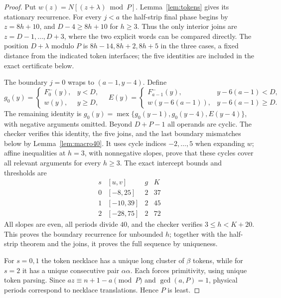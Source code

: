 \documentclass[11pt]{article}
\theoremstyle{remark}\newtheorem{remark}[theorem]{Remark}
\DeclareMathOperator{\mex}{mex}
\begin{document}
\begin{proof}
Put $w(z)=N[(z+\lambda)\bmod P]$. Lemma~\ref{lem:tokens} gives its
stationary recurrence. For every $j<a$ the half-strip final phase begins
by $z=8h+10$, and $D-4\ge8h+10$ for $h\ge3$.
Thus the only interior joins are $z=D-1,\ldots,D+3$, where the two
explicit words can be compared directly. The position $D+\lambda$
modulo $P$ is $8h-14,8h+2,8h+5$ in the three cases, a fixed distance
from the indicated token interfaces; the five identities are included
in the exact certificate below.

The boundary $j=0$ wraps to $(a-1,y-4)$. Define
\[
 g_0(y)=\begin{cases}F^-_0(y),&y<D,\\w(y),&y\ge D,\end{cases}
 \quad
 E(y)=\begin{cases}F^-_{a-1}(y),&y-6(a-1)<D,\\
 w(y-6(a-1)),&y-6(a-1)\ge D.\end{cases}
\]
The remaining identity is
$g_0(y)=\mex\{g_0(y-1),g_0(y-4),E(y-4)\}$, with negative
arguments omitted. Beyond $D+P-1$ all operands are cyclic.
The checker  verifies this
identity, the five joins, and the last boundary mismatches below by
Lemma~\ref{lem:macro40}. It uses cycle indices $-2,\ldots,5$ when
expanding $w$; affine inequalities at $h=3$, with nonnegative slopes,
prove that these cycles cover all relevant arguments for every $h\ge3$.
The exact intercept bounds and thresholds are
\[
\begin{array}{c|c|c|c}
s&[u,v]&g&K\\\hline
0&[-8,25]&2&37\\
1&[-10,39]&2&45\\
2&[-28,75]&2&72
\end{array}
\]
All slopes are even, all periods divide $40$, and the checker verifies
$3\le h<K+20$. This proves the boundary recurrence for unbounded $h$;
together with the half-strip theorem and the joins, it proves the full
sequence by uniqueness.

For $s=0,1$ the token necklace has a unique long cluster of $\beta$
tokens, while for $s=2$ it has a unique consecutive pair $\alpha\alpha$.
Each forces primitivity, using unique token parsing.
Since $az\equiv n+1-a\pmod P$ and $\gcd(a,P)=1$, physical periods
correspond to necklace translations. Hence $P$ is least.


\end{proof}
\end{document}

